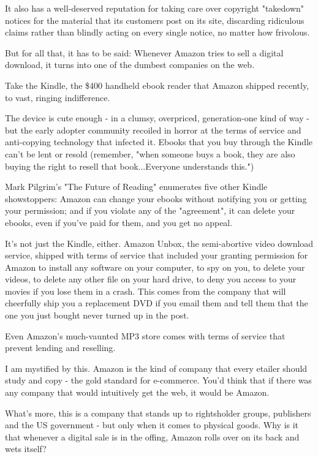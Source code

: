 It also has a well-deserved reputation for taking care over
copyright "takedown" notices for the material that its customers
post on its site, discarding ridiculous claims rather than blindly
acting on every single notice, no matter how frivolous.

But for all that, it has to be said: Whenever Amazon tries to sell
a digital download, it turns into one of the dumbest companies on
the web.

Take the Kindle, the \$400 handheld ebook reader that Amazon
shipped recently, to vast, ringing indifference.

The device is cute enough - in a clumsy, overpriced, generation-one
kind of way - but the early adopter community recoiled in horror at
the terms of service and anti-copying technology that infected it.
Ebooks that you buy through the Kindle can't be lent or resold
(remember, "when someone buys a book, they are also buying the
right to resell that book...Everyone understands this.")

Mark Pilgrim's "The Future of Reading" enumerates five other Kindle
showstoppers: Amazon can change your ebooks without notifying you
or getting your permission; and if you violate any of the
"agreement", it can delete your ebooks, even if you've paid for
them, and you get no appeal.

It's not just the Kindle, either. Amazon Unbox, the semi-abortive
video download service, shipped with terms of service that included
your granting permission for Amazon to install any software on your
computer, to spy on you, to delete your videos, to delete any other
file on your hard drive, to deny you access to your movies if you
lose them in a crash. This comes from the company that will
cheerfully ship you a replacement DVD if you email them and tell
them that the one you just bought never turned up in the post.

Even Amazon's much-vaunted MP3 store comes with terms of service
that prevent lending and reselling.

I am mystified by this. Amazon is the kind of company that every
etailer should study and copy - the gold standard for e-commerce.
You'd think that if there was any company that would intuitively
get the web, it would be Amazon.

What's more, this is a company that stands up to rightsholder
groups, publishers and the US government - but only when it comes
to physical goods. Why is it that whenever a digital sale is in the
offing, Amazon rolls over on its back and wets itself?

